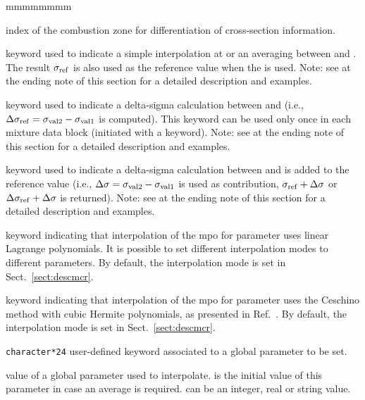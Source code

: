 \begin{ListeDeDescription}{mmmmmmmm}
\item[\dusa{ivarty}] index of the combustion zone for differentiation of cross-section information.

\item[\moc{SET}] keyword used to indicate a simple interpolation at  or an averaging between  and . The result $\sigma_{\rm ref}$ is also used as the reference value when the  is used. Note: see at the ending note of this section for a detailed description and examples.

\item[\moc{DELTA}] keyword used to indicate a delta-sigma calculation between  and 
(i.e., $\Delta\sigma_{\rm ref}=\sigma_{\rm val2}-\sigma_{\rm val1}$ is computed). This keyword can be used only once in each mixture data block (initiated
with a  keyword). Note: see at the ending note of this section for a detailed description and examples.

\item[\moc{ADD}] keyword used to indicate a delta-sigma calculation between  and  is added to the reference value
(i.e., $\Delta\sigma=\sigma_{\rm val2}-\sigma_{\rm val1}$ is used as contribution, $\sigma_{\rm ref}+\Delta\sigma$ or $\Delta\sigma_{\rm ref}+\Delta\sigma$ is returned). Note: see at the ending note of this section for a detailed description and examples.

\item[\moc{LINEAR}] keyword indicating that interpolation of the {\sc mpo} for parameter  uses linear Lagrange
polynomials. It is possible to set different interpolation modes to different parameters. By default, the interpolation mode is set in Sect.~\ref{sect:descmcr}.

\item[\moc{CUBIC}] keyword indicating that interpolation of the {\sc mpo} for parameter  uses the Ceschino method
with cubic Hermite polynomials, as presented in Ref.~. By default, the interpolation mode is set in Sect.~\ref{sect:descmcr}.

\item[\dusa{PARKEY}] {\tt character*24} user-defined keyword associated to a global
parameter to be set.

\item[\dusa{val1}] value of a global parameter used to interpolate.  is the initial value of this parameter in case an average is required.  can be an integer, real or string value.


\end{ListeDeDescription}
